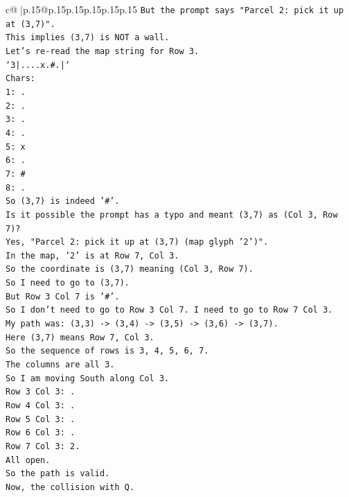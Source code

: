 \documentclass{article}
\begin{document}
{\begin{supertabular}{c@{$\;$}|p{.15\linewidth}@{}p{.15\linewidth}p{.15\linewidth}p{.15\linewidth}p{.15\linewidth}p{.15\linewidth}}
{{{\texttt{But the prompt says "Parcel 2: pick it up at (3,7)".} \\
\texttt{This implies (3,7) is NOT a wall.} \\
\texttt{Let's re{-}read the map string for Row 3.} \\
\texttt{`3|....x.\#.|`} \\
\texttt{Chars:} \\
\texttt{1: .} \\
\texttt{2: .} \\
\texttt{3: .} \\
\texttt{4: .} \\
\texttt{5: x} \\
\texttt{6: .} \\
\texttt{7: \#} \\
\texttt{8: .} \\
\texttt{So (3,7) is indeed '\#'.} \\
\texttt{Is it possible the prompt has a typo and meant (3,7) as (Col 3, Row 7)?} \\
\texttt{Yes, "Parcel 2: pick it up at (3,7) (map glyph '2')".} \\
\texttt{In the map, '2' is at Row 7, Col 3.} \\
\texttt{So the coordinate is (3,7) meaning (Col 3, Row 7).} \\
\texttt{So I need to go to (3,7).} \\
\texttt{But Row 3 Col 7 is '\#'.} \\
\texttt{So I don't need to go to Row 3 Col 7. I need to go to Row 7 Col 3.} \\
\texttt{My path was: (3,3) {-}> (3,4) {-}> (3,5) {-}> (3,6) {-}> (3,7).} \\
\texttt{Here (3,7) means Row 7, Col 3.} \\
\texttt{So the sequence of rows is 3, 4, 5, 6, 7.} \\
\texttt{The columns are all 3.} \\
\texttt{So I am moving South along Col 3.} \\
\texttt{Row 3 Col 3: .} \\
\texttt{Row 4 Col 3: .} \\
\texttt{Row 5 Col 3: .} \\
\texttt{Row 6 Col 3: .} \\
\texttt{Row 7 Col 3: 2.} \\
\texttt{All open.} \\
\texttt{So the path is valid.} \\
\texttt{Now, the collision with Q.} \\
}}}
\end{supertabular}}
\end{document}
